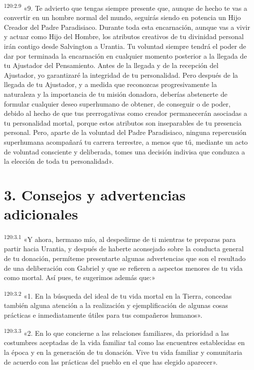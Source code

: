 \par 
\textsuperscript{120:2.9} «9. Te advierto que tengas siempre presente que, aunque de hecho te vas a convertir en un hombre normal del mundo, seguirás siendo en potencia un Hijo Creador del Padre Paradisiaco. Durante toda esta encarnación, aunque vas a vivir y actuar como Hijo del Hombre, los atributos creativos de tu divinidad personal irán contigo desde Salvington a Urantia. Tu voluntad siempre tendrá el poder de dar por terminada la encarnación en cualquier momento posterior a la llegada de tu Ajustador del Pensamiento. Antes de la llegada y de la recepción del Ajustador, yo garantizaré la integridad de tu personalidad. Pero después de la llegada de tu Ajustador, y a medida que reconozcas progresivamente la naturaleza y la importancia de tu misión donadora, deberías abstenerte de formular cualquier deseo superhumano de obtener, de conseguir o de poder, debido al hecho de que tus prerrogativas como creador permanecerán asociadas a tu personalidad mortal, porque estos atributos son inseparables de tu presencia personal. Pero, aparte de la voluntad del Padre Paradisiaco, ninguna repercusión superhumana acompañará tu carrera terrestre, a menos que tú, mediante un acto de voluntad consciente y deliberada, tomes una decisión indivisa que conduzca a la elección de toda tu personalidad».

\section*{3. Consejos y advertencias adicionales}
\par 
\textsuperscript{120:3.1} «Y ahora, hermano mío, al despedirme de ti mientras te preparas para partir hacia Urantia, y después de haberte aconsejado sobre la conducta general de tu donación, permíteme presentarte algunas advertencias que son el resultado de una deliberación con Gabriel y que se refieren a aspectos menores de tu vida como mortal. Así pues, te sugerimos además que:»

\par 
\textsuperscript{120:3.2} «1. En la búsqueda del ideal de tu vida mortal en la Tierra, concedas también alguna atención a la realización y ejemplificación de algunas cosas prácticas e inmediatamente útiles para tus compañeros humanos».

\par 
\textsuperscript{120:3.3} «2. En lo que concierne a las relaciones familiares, da prioridad a las costumbres aceptadas de la vida familiar tal como las encuentres establecidas en la época y en la generación de tu donación. Vive tu vida familiar y comunitaria de acuerdo con las prácticas del pueblo en el que has elegido aparecer».

